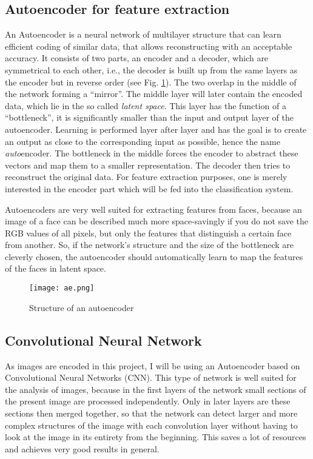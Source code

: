 \subsection{Autoencoder for feature extraction}
An Autoencoder is a neural network of multilayer structure that can learn
efficient coding of similar data, that allows reconstructing with an acceptable
accuracy. It consists of two parts, an encoder and a decoder, which are
symmetrical to each other, i.e., the decoder is built up from the same layers as
the encoder but in reverse order (see Fig. \ref{ae}). The two overlap in the
middle of the network forming a ``mirror''. The middle layer will later contain
the encoded data, which lie in the so called \textit{latent space}. This layer
has the function of a ``bottleneck'', it is significantly smaller than the input
and output layer of the autoencoder. Learning is performed layer after layer and
has the goal is to create an output as close to the corresponding input as
possible, hence the name \textit{auto}encoder. The bottleneck in the middle
forces the encoder to abstract these vectors and map them to a smaller
representation. The decoder then tries to reconstruct the original data. For
feature extraction purposes, one is merely interested in the encoder part which
will be fed into the classification system.

Autoencoders are very well suited for extracting features from faces, because an
image of a face can be described much more space-savingly if you do not save the
RGB values of all pixels, but only the features that distinguish a certain face
from another. So, if the network's structure and the size of the bottleneck are
cleverly chosen, the autoencoder should automatically learn to map the features
of the faces in latent space. 

\begin{figure}[h]
  \centering
  \texttt{[image: ae.png]}
  \caption{Structure of an autoencoder}
  \label{ae}
\end{figure}

\subsection{Convolutional Neural Network}
As images are encoded in this project, I will be using an Autoencoder based on
Convolutional Neural Networks (CNN). This type of network is well suited for the
analysis of images, because in the first layers of the network small sections of
the present image are processed independently. Only in later layers are these
sections then merged together, so that the network can detect larger and more
complex structures of the image with each convolution layer without having to
look at the image in its entirety from the beginning. This saves a lot of
resources and achieves very good results in general. 

